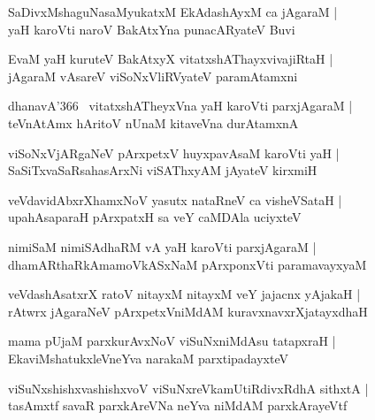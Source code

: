 \documentclass[twoside,12pt,openright]{book}
\newcounter{shloka}[chapter]
\begin{document}
\begin{shloka}%
SaDivxMshaguNasaMyukatxM EkAdashAyxM ca jAgaraM |\\
yaH karoVti naroV BakAtxYna punacARyateV Buvi
\end{shloka}

\begin{shloka}%
EvaM yaH kuruteV BakAtxyX vitatxshAThayxvivajiRtaH |\\
jAgaraM vAsareV viSoNxVliRVyateV paramAtamxni
\end{shloka}

\begin{shloka}%
dhanavA\char'366 ~vitatxshATheyxVna yaH karoVti parxjAgaraM |\\
teVnAtAmx hAritoV nUnaM kitaveVna durAtamxnA
\end{shloka}

\begin{shloka}%
viSoNxVjARgaNeV pArxpetxV huyxpavAsaM karoVti yaH |\\
SaSiTxvaSaRsahasArxNi viSAThxyAM jAyateV kirxmiH 
\end{shloka}

\begin{shloka}%
veVdavidAbxrXhamxNoV yasutx nataRneV ca visheVSataH |\\
upahAsaparaH pArxpatxH sa veY caMDAla uciyxteV
\end{shloka}

\begin{shloka}%
nimiSaM nimiSAdhaRM vA yaH karoVti parxjAgaraM |\\
dhamARthaRkAmamoVkASxNaM pArxponxVti paramavayxyaM
\end{shloka}

\begin{shloka}%
veVdashAsatxrX ratoV nitayxM nitayxM veY jajacnx yAjakaH |\\
rAtwrx jAgaraNeV pArxpetxVniMdAM kuravxnavxrXjatayxdhaH
\end{shloka}

\begin{shloka}%
mama pUjaM parxkurAvxNoV viSuNxniMdAsu tatapxraH |\\
EkaviMshatukxleVneYva narakaM parxtipadayxteV
\end{shloka}

\begin{shloka}%
viSuNxshishxvashishxvoV viSuNxreVkamUtiRdivxRdhA sithxtA |\\
tasAmxtf savaR parxkAreVNa neYva niMdAM parxkArayeVtf
\end{shloka}
\end{document}
